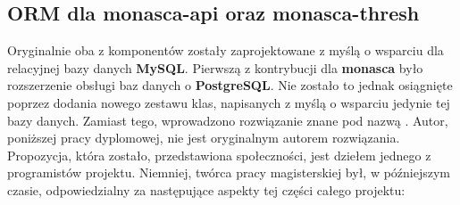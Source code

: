 \subsection{ORM dla monasca-api oraz monasca-thresh}
Oryginalnie oba z komponentów zostały zaprojektowane z myślą o wsparciu dla relacyjnej bazy danych \textbf{MySQL}. 
Pierwszą z kontrybucji dla \textbf{monasca} było rozszerzenie obsługi baz danych o \textbf{PostgreSQL}. Nie zostało
to jednak osiągnięte poprzez dodania nowego zestawu klas, napisanych z myślą o wsparciu jedynie tej bazy danych. Zamiast
tego, wprowadzono rozwiązanie znane pod nazwą .
Autor, poniższej pracy dyplomowej, nie jest oryginalnym autorem rozwiązania. Propozycja, która zostało,
przedstawiona społeczności, jest dziełem jednego z programistów projektu. Niemniej, twórca pracy magisterskiej był, w późniejszym czasie,
odpowiedzialny za następujące aspekty tej części całego projektu:


